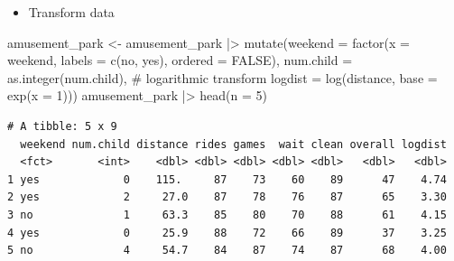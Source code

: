 \documentclass[
  ignorenonframetext,
]{beamer}
\newenvironment{Shaded}{\begin{snugshade}}{\end{snugshade}}
\newcommand{\AttributeTok}[1]{\textcolor[rgb]{0.40,0.45,0.13}{#1}}
\newcommand{\CommentTok}[1]{\textcolor[rgb]{0.37,0.37,0.37}{#1}}
\newcommand{\ConstantTok}[1]{\textcolor[rgb]{0.56,0.35,0.01}{#1}}
\newcommand{\DecValTok}[1]{\textcolor[rgb]{0.68,0.00,0.00}{#1}}
\newcommand{\FunctionTok}[1]{\textcolor[rgb]{0.28,0.35,0.67}{#1}}
\newcommand{\NormalTok}[1]{\textcolor[rgb]{0.00,0.23,0.31}{#1}}
\newcommand{\OtherTok}[1]{\textcolor[rgb]{0.00,0.23,0.31}{#1}}
\newcommand{\SpecialCharTok}[1]{\textcolor[rgb]{0.37,0.37,0.37}{#1}}
\newcommand{\StringTok}[1]{\textcolor[rgb]{0.13,0.47,0.30}{#1}}
\providecommand{\tightlist}{%
  \setlength{\itemsep}{0pt}\setlength{\parskip}{0pt}}\usepackage{longtable,booktabs,array}
\begin{document}
\begin{frame}[fragile]{}
\label{section-4}
\begin{itemize}
\tightlist
\item
  Transform data
\end{itemize}

\tiny

\begin{Shaded}
\begin{Highlighting}[]
\NormalTok{amusement\_park }\OtherTok{\textless{}{-}}\NormalTok{ amusement\_park }\SpecialCharTok{|\textgreater{}} 
  \FunctionTok{mutate}\NormalTok{(}\AttributeTok{weekend =} \FunctionTok{factor}\NormalTok{(}\AttributeTok{x =}\NormalTok{ weekend, }
                          \AttributeTok{labels =} \FunctionTok{c}\NormalTok{(}\StringTok{\textquotesingle{}no\textquotesingle{}}\NormalTok{, }\StringTok{\textquotesingle{}yes\textquotesingle{}}\NormalTok{),}
                          \AttributeTok{ordered =} \ConstantTok{FALSE}\NormalTok{),}
         \AttributeTok{num.child =} \FunctionTok{as.integer}\NormalTok{(num.child),}
         \CommentTok{\# logarithmic transform}
         \AttributeTok{logdist =} \FunctionTok{log}\NormalTok{(distance, }\AttributeTok{base =} \FunctionTok{exp}\NormalTok{(}\AttributeTok{x =} \DecValTok{1}\NormalTok{)))}
\NormalTok{amusement\_park }\SpecialCharTok{|\textgreater{}} \FunctionTok{head}\NormalTok{(}\AttributeTok{n =} \DecValTok{5}\NormalTok{)}
\end{Highlighting}
\end{Shaded}

\begin{verbatim}
# A tibble: 5 x 9
  weekend num.child distance rides games  wait clean overall logdist
  <fct>       <int>    <dbl> <dbl> <dbl> <dbl> <dbl>   <dbl>   <dbl>
1 yes             0    115.     87    73    60    89      47    4.74
2 yes             2     27.0    87    78    76    87      65    3.30
3 no              1     63.3    85    80    70    88      61    4.15
4 yes             0     25.9    88    72    66    89      37    3.25
5 no              4     54.7    84    87    74    87      68    4.00
\end{verbatim}
\end{frame}
\end{document}
